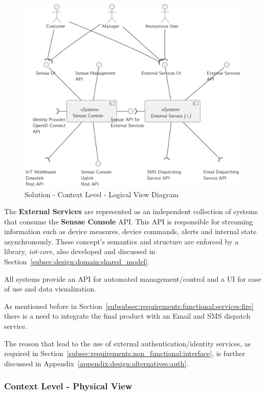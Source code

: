 \begin{figure}[H]
   \centering
   \includegraphics[page=1,width=0.8\columnwidth]{assets/diagrams/design/architectural/level1/logical-view.pdf}
   \caption[Solution - Context Level - Logical View Diagram]{Solution - Context Level - Logical View Diagram}
   \label{fig:design:architecture:context:logical:diagram}
\end{figure}

The \textbf{External Services} are represented as an independent collection of systems that consume the \textbf{Sensae Console} \gls{API}. This \gls{API} is responsible for streaming information such as device measures, device commands, alerts and internal state asynchronously. These concept's semantics and structure are enforced by a library, \textit{iot-core}, also developed and discussed in Section~\ref{subsec:design:domain:shared_model}.

All systems provide an \gls{API} for automated management/control and a \gls{UI} for ease of use and data visualization.

As mentioned before in Section~\ref{subsubsec:requirements:functional:services:fire} there is a need to integrate the final product with an Email and SMS dispatch service.

The reason that lead to the use of external authentication/identity services, as required in Section~\ref{subsec:requirements:non_functional:interface}, is further discussed in Appendix~\ref{appendix:design:alternatives:auth}.

\subsubsection{Context Level - Physical View}
\label{subsubsec:design:architecture:context:physical}

